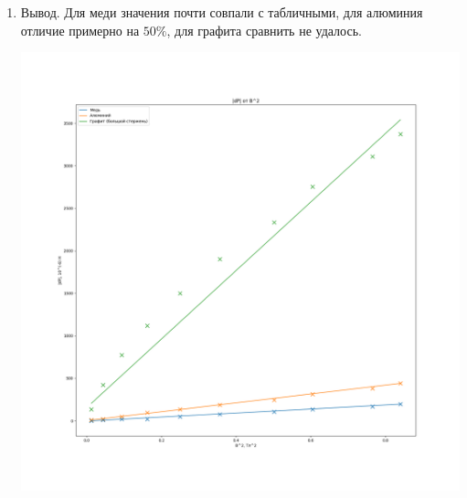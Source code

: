 \documentclass[a4paper, 12pt]{article}
\begin{document}
\begin{enumerate}
    \item Вывод. Для меди значения почти совпали с табличными, для алюминия отличие примерно на $50 \%$, для графита сравнить не удалось.

    \includegraphics[width=\linewidth]{graph2.png}
\end{enumerate}
\end{document}
